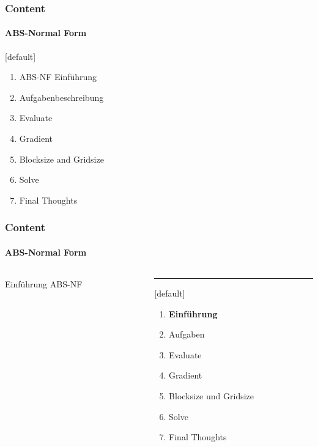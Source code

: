 \begin{frame}
	\frametitle{Content}
	\framesubtitle{ABS-Normal Form}
	[default]
	\fontsize{12pt}{7.2}\selectfont
	\begin{enumerate}
		\item ABS-NF Einführung
		\item Aufgabenbeschreibung
		\item Evaluate
		\item Gradient
		\item Blocksize and Gridsize
		\item Solve
		\item Final Thoughts
	\end{enumerate}
\end{frame}

\begin{frame}
	\frametitle{Content}
	\framesubtitle{ABS-Normal Form}
	\begin{columns}[T] %
		\begin{column}{.48\textwidth}
			
			\begin{center}
				{\Huge Einführung ABS-NF}
			\end{center}
			
		\end{column}%
		\hfill%
		\begin{column}{.48\textwidth}
			\color{blue}\rule{\linewidth}{4pt}
			
			\begin{enumerate}
				\item \textbf{Einführung}
				\item Aufgaben
				\item Evaluate
				\item Gradient
				\item Blocksize und Gridsize
				\item Solve
				\item Final Thoughts
			\end{enumerate}
		\end{column}%
	\end{columns}
\end{frame}
